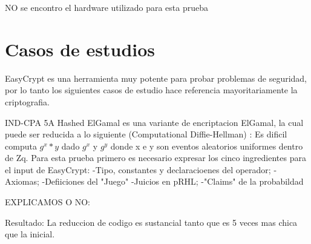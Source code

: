 \documentclass[runningheads,a4paper]{llncs}
\begin{document}
NO se encontro el hardware utilizado para esta prueba




\section{Casos de estudios}
EasyCrypt es una herramienta muy potente para probar problemas de seguridad, por lo tanto los siguientes casos de estudio hace referencia mayoritariamente la criptografia.

IND-CPA  5A
\cite{article5}
Hashed ElGamal es una variante de encriptacion ElGamal, la cual puede ser reducida a lo siguiente (Computational Diffie-Hellman) : Es dificil computa $g^x*y$ dado $g^x$ y $g^y$ donde x e y son eventos aleatorios uniformes dentro de Zq.
Para esta prueba primero es necesario expresar los cinco ingredientes para el input de EasyCrypt:
-Tipo, constantes y declaracioenes del operador;
-Axiomas;
-Defiiciones del "Juego"
-Juicios en pRHL;
-"Claims" de la probabildad

EXPLICAMOS O NO:

Resultado: La reduccion de codigo es sustancial tanto que es 5 veces mas chica que la inicial.
\end{document}
